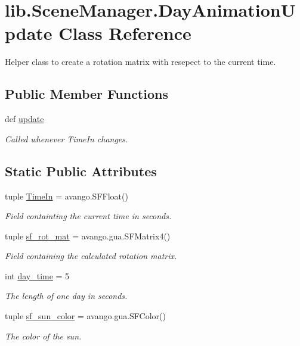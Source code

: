 \hypertarget{classlib_1_1SceneManager_1_1DayAnimationUpdate}{\section{lib.\-Scene\-Manager.\-Day\-Animation\-Update \-Class \-Reference}
\label{classlib_1_1SceneManager_1_1DayAnimationUpdate}
}


\-Helper class to create a rotation matrix with resepect to the current time.  


\subsection*{\-Public \-Member \-Functions}
\begin{DoxyCompactItemize}
\item 
def \hyperlink{classlib_1_1SceneManager_1_1DayAnimationUpdate_a63d322fe9a563897bc0661ffc269617b}{update}
\begin{DoxyCompactList}\small\item\em \-Called whenever \-Time\-In changes. \end{DoxyCompactList}\end{DoxyCompactItemize}
\subsection*{\-Static \-Public \-Attributes}
\begin{DoxyCompactItemize}
\item 
tuple \hyperlink{classlib_1_1SceneManager_1_1DayAnimationUpdate_ac9cfd8d097643852f2572adfc09bb2c1}{\-Time\-In} = avango.\-S\-F\-Float()
\begin{DoxyCompactList}\small\item\em \-Field containting the current time in seconds. \end{DoxyCompactList}\item 
tuple \hyperlink{classlib_1_1SceneManager_1_1DayAnimationUpdate_a888dc09a20ba55f39ac1c99696206f45}{sf\-\_\-rot\-\_\-mat} = avango.\-gua.\-S\-F\-Matrix4()
\begin{DoxyCompactList}\small\item\em \-Field containing the calculated rotation matrix. \end{DoxyCompactList}\item 
int \hyperlink{classlib_1_1SceneManager_1_1DayAnimationUpdate_a88ab21bccc1f73b5eb20b4e7ff2711c9}{day\-\_\-time} = 5
\begin{DoxyCompactList}\small\item\em \-The length of one day in seconds. \end{DoxyCompactList}\item 
tuple \hyperlink{classlib_1_1SceneManager_1_1DayAnimationUpdate_aad024072c96c856bca6f15197955414e}{sf\-\_\-sun\-\_\-color} = avango.\-gua.\-S\-F\-Color()
\begin{DoxyCompactList}\small\item\em \-The color of the sun. \end{DoxyCompactList}\end{DoxyCompactItemize}


